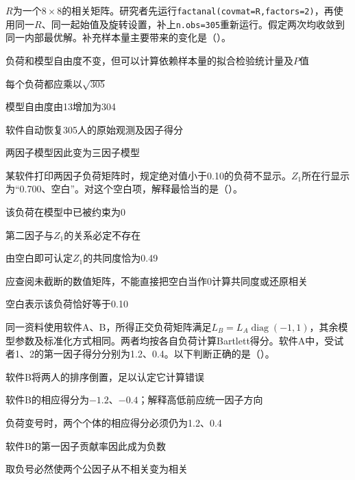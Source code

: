 \par\noindent\begin{minipage}{\linewidth}
$R$为一个$8\times8$的相关矩阵。研究者先运行\texttt{factanal(covmat=R,factors=2)}，再使用同一$R$、同一起始值及旋转设置，补上\texttt{n.obs=305}重新运行。假定两次均收敛到同一内部最优解。补充样本量主要带来的变化是（\quad）。
\begin{choices}
\item 负荷和模型自由度不变，但可以计算依赖样本量的拟合检验统计量及$P$值
\item 每个负荷都应乘以$\sqrt{305}$
\item 模型自由度由13增加为304
\item 软件自动恢复305人的原始观测及因子得分
\item 两因子模型因此变为三因子模型
\end{choices}
\end{minipage}\par\medskip

\par\noindent\begin{minipage}{\linewidth}
某软件打印两因子负荷矩阵时，规定绝对值小于0.10的负荷不显示。$Z_1$所在行显示为“0.700、空白”。对这个空白项，解释最恰当的是（\quad）。
\begin{choices}
\item 该负荷在模型中已被约束为0
\item 第二因子与$Z_1$的关系必定不存在
\item 由空白即可认定$Z_1$的共同度恰为0.49
\item 应查阅未截断的数值矩阵，不能直接把空白当作0计算共同度或还原相关
\item 空白表示该负荷恰好等于0.10
\end{choices}
\end{minipage}\par\medskip

\par\noindent\begin{minipage}{\linewidth}
同一资料使用软件A、B，所得正交负荷矩阵满足$L_B=L_A\operatorname{diag}(-1,1)$，其余模型参数及标准化方式相同。两者均按各自负荷计算Bartlett得分。软件A中，受试者1、2的第一因子得分分别为1.2、0.4。以下判断正确的是（\quad）。
\begin{choices}
\item 软件B将两人的排序倒置，足以认定它计算错误
\item 软件B的相应得分为$-1.2$、$-0.4$；解释高低前应统一因子方向
\item 负荷变号时，两个个体的相应得分必须仍为1.2、0.4
\item 软件B的第一因子贡献率因此成为负数
\item 取负号必然使两个公因子从不相关变为相关
\end{choices}
\end{minipage}\par\medskip

